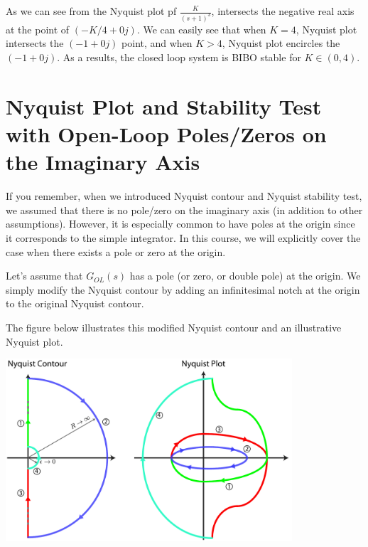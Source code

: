 \documentclass{article}
\begin{document}
As we can see from the Nyquist plot pf $\frac{K}{(s+1)^3}$, 
intersects the negative real axis at the point of $(-K/4 + 0 j)$.
We can easily see that when $K = 4$, Nyquist plot intersects 
the $(-1 + 0 j)$ point, and when $K > 4$, Nyquist plot encircles 
the $(-1 + 0 j)$. As a results, the closed loop system is BIBO
stable for $K \in (0 , 4)$.
 
\section*{Nyquist Plot and Stability Test with  Open-Loop Poles/Zeros on the Imaginary Axis}

If you remember, when we introduced Nyquist contour and Nyquist stability test, we assumed that there is no pole/zero on the imaginary axis (in addition to other assumptions). However, it is especially common to have poles at the origin since it corresponds to the simple integrator. In this course, we will explicitly cover the case when there exists a pole or zero at the origin.

Let's assume that $G_{OL}(s)$ has a pole (or zero, or double pole)
at the origin. We simply modify the Nyquist contour by adding an
infinitesimal notch at the origin to the original Nyquist contour. 

The figure below illustrates this modified Nyquist contour and 
an illustrative Nyquist plot. 

\vspace{12 pt}

  \begin{minipage}[h]{1\linewidth}
    \begin{center}
      \includegraphics[width=0.8\textwidth]{figs/originnyq}
    \end{center}
  \end{minipage}

\vspace{6 pt}
\end{document}
